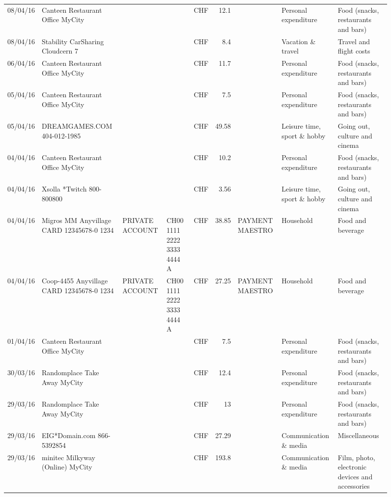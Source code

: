 \begin{landscape}
\begin{sidewaysfigure}
\begin{table}[h]
\begin{center}
\begin{tabular}{rllllrlll}
		08/04/16 & Canteen Restaurant Office      MyCity &       &       & CHF   & 12.1  &       & Personal expenditure & Food (snacks, restaurants and bars) \\
		08/04/16 & Stability CarSharing      Cloudcern 7 &       &       & CHF   & 8.4   &       & Vacation \& travel & Travel and flight costs \\
		06/04/16 & Canteen Restaurant Office      MyCity &       &       & CHF   & 11.7  &       & Personal expenditure & Food (snacks, restaurants and bars) \\
		05/04/16 & Canteen Restaurant Office      MyCity &       &       & CHF   & 7.5   &       & Personal expenditure & Food (snacks, restaurants and bars) \\
		05/04/16 & DREAMGAMES.COM           404-012-1985 &       &       & CHF   & 49.58 &       & Leisure time, sport \& hobby & Going out, culture and cinema \\
		04/04/16 & Canteen Restaurant Office      MyCity &       &       & CHF   & 10.2  &       & Personal expenditure & Food (snacks, restaurants and bars) \\
		04/04/16 & Xsolla *Twitch           800-800800 &       &       & CHF   & 3.56  &       & Leisure time, sport \& hobby & Going out, culture and cinema \\
		04/04/16 & Migros MM Anyvillage CARD 12345678-0 1234 & PRIVATE ACCOUNT & CH00 1111 2222 3333 4444 A & CHF   & 38.85 & PAYMENT MAESTRO & Household & Food and beverage \\
		04/04/16 & Coop-4455 Anyvillage CARD 12345678-0 1234 & PRIVATE ACCOUNT & CH00 1111 2222 3333 4444 A & CHF   & 27.25 & PAYMENT MAESTRO & Household & Food and beverage \\
		01/04/16 & Canteen Restaurant Office      MyCity &       &       & CHF   & 7.5   &       & Personal expenditure & Food (snacks, restaurants and bars) \\
		30/03/16 & Randomplace Take Away     MyCity &       &       & CHF   & 12.4  &       & Personal expenditure & Food (snacks, restaurants and bars) \\
		29/03/16 & Randomplace Take Away     MyCity &       &       & CHF   & 13    &       & Personal expenditure & Food (snacks, restaurants and bars) \\
		29/03/16 & EIG*Domain.com           866-5392854 &       &       & CHF   & 27.29 &       & Communication \& media & Miscellaneous \\
		29/03/16 & minitec Milkyway (Online) MyCity &       &       & CHF   & 193.8 &       & Communication \& media & Film, photo, electronic devices and accessories \\

\end{tabular}
\end{center}
\end{table}
\end{sidewaysfigure}
\end{landscape}

